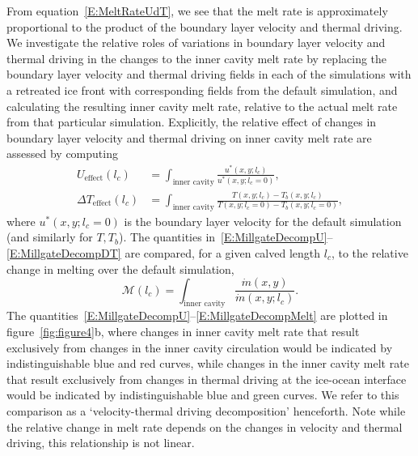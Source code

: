 \documentclass[draft]{agujournal2019}
\begin{document}
From equation~\eqref{E:MeltRateUdT}, we see that the melt rate is approximately proportional to the product of the boundary layer velocity and thermal driving. We investigate the relative roles of variations in boundary layer velocity and thermal driving in the changes to the inner cavity melt rate by replacing the boundary layer velocity and thermal driving fields in each of the simulations with a retreated ice front with corresponding fields from the default simulation, and calculating the resulting inner cavity melt rate, relative to the actual melt rate from that particular simulation. Explicitly, the relative effect of changes in boundary layer velocity and thermal driving on inner cavity melt rate are assessed by computing
 \begin{align}
U_{\text{effect}}(l_c) &=  \int_{\text{inner cavity}}\frac{u^*(x,y; l_c)}{u^*(x,y; l_c = 0)}, \label{E:MillgateDecompU}\\ \Delta T_{\text{effect}}(l_c) &= \int_{\text{inner cavity}}\frac{T(x,y; l_c) - T_b(x,y; l_c)}{T(x,y; l_c = 0) - T_{b}(x,y; l_c = 0)},\label{E:MillgateDecompDT}
 \end{align}
  where $u^*(x,y;l_c = 0)$ is the boundary layer velocity for the default simulation (and similarly for $T, T_b$). The quantities in~\eqref{E:MillgateDecompU}--\eqref{E:MillgateDecompDT} are compared, for a given calved length $l_c$, to the relative change in melting over the default simulation,
 \begin{equation}\label{E:MillgateDecompMelt}
   \mathcal{M}(l_c) =  \int_{\text{inner cavity}}\frac{\dot{m}(x,y)}{\dot{m}(x,y; l_c)}.
 \end{equation}
The quantities~\eqref{E:MillgateDecompU}--\eqref{E:MillgateDecompMelt} are plotted in figure~\ref{fig:figure4}b, where changes in inner cavity melt rate that result exclusively from changes in the inner cavity circulation would be indicated by indistinguishable blue and red curves, while changes in the inner cavity melt rate that result exclusively from changes in thermal driving at the ice-ocean interface would be indicated by indistinguishable blue and green curves. We refer to this comparison as a `velocity-thermal driving decomposition' henceforth. Note while the relative change in melt rate depends on the changes in velocity and thermal driving, this relationship is not linear. 
\end{document}
